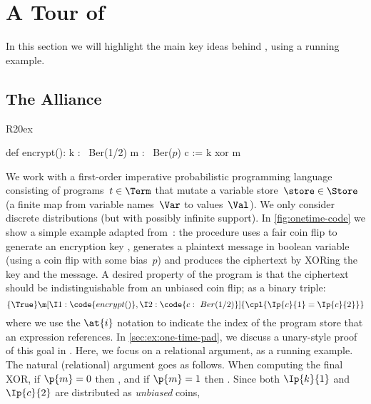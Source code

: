 \section{A Tour of \thelogic}
\label{sec:overview}



In this section we will highlight the main key ideas behind
\thelogic, using a running example.

\subsection{The Alliance}
\label{sec:overview:intro}

\begin{wrapfigure}[7]{R}{20ex}\begin{sourcecode*}[linewidth=.9\linewidth,xleftmargin=.1\linewidth,
    belowskip=-.5em,aboveskip=-1em,
    gobble=2
  ]
  def encrypt():
    k :~ Ber(1/2)
    m :~ Ber($p$)
    c := k xor m
  \end{sourcecode*}\caption{One time pad.}
  \label{fig:onetime-code}
\end{wrapfigure}
We work with a first-order imperative probabilistic programming language
consisting of programs~$t\in\Term$ that mutate a variable store~$\store\in\Store$
(\ie a finite map from variable names~$\Var$ to values~$\Val$).
We only consider discrete distributions
(but with possibly infinite support).
In \cref{fig:onetime-code} we show a simple example adapted from~\cite{barthe2019probabilistic}:
the  procedure uses a fair coin flip to generate an encryption key
, generates a plaintext message in boolean variable 
(using a coin flip with some bias~$p$)
and produces the ciphertext  by XORing the key and the message.
A desired property of the program is that the ciphertext should be
indistinguishable from an unbiased coin flip; as a binary triple:
\begin{equation}
  \{\True\}
  \m[
    \I1: \code{encrypt()},
    \I2: \code{c:~Ber(1/2)}
  ]
  \{
    \cpl{ \Ip{c}{1}=\Ip{c}{2} }
  \}
  \label{ex:xor:goal}
\end{equation}
where we use the $\at{i}$ notation to indicate the index of the program store that an expression references.
In \cref{sec:ex:one-time-pad}, we discuss a unary-style proof of this goal in \thelogic. Here, we focus on a relational argument, as a running example. The natural (relational) argument goes as follows.
When computing the final XOR,
  if $\p{m}=0$ then ,
  and if $\p{m}=1$ then .
Since both $\Ip{k}{1}$ and $\Ip{c}{2}$ are distributed as \emph{unbiased} coins,

